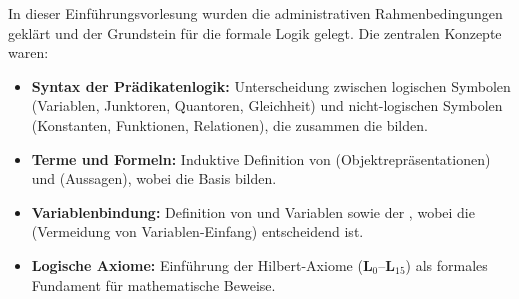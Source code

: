 \begin{nice-box}
In dieser Einführungsvorlesung wurden die administrativen Rahmenbedingungen geklärt und der Grundstein für die formale Logik gelegt. Die zentralen Konzepte waren:
\begin{itemize}
    \item \textbf{Syntax der Prädikatenlogik:} Unterscheidung zwischen logischen Symbolen (Variablen, Junktoren, Quantoren, Gleichheit) und nicht-logischen Symbolen (Konstanten, Funktionen, Relationen), die zusammen die  bilden.
    \item \textbf{Terme und Formeln:} Induktive Definition von  (Objektrepräsentationen) und  (Aussagen), wobei  die Basis bilden.
    \item \textbf{Variablenbindung:} Definition von  und  Variablen sowie der , wobei die  (Vermeidung von Variablen-Einfang) entscheidend ist.
    \item \textbf{Logische Axiome:} Einführung der Hilbert-Axiome (\textbf{L$_0$}--\textbf{L$_{15}$}) als formales Fundament für mathematische Beweise.
\end{itemize}
\end{nice-box}

\begin{ai-global-state-checkpoint-invisible-content}
\end{ai-global-state-checkpoint-invisible-content}

